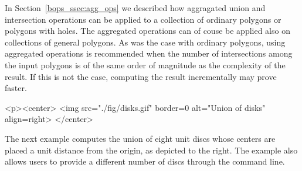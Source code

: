 In Section~\ref{bops_ssec:agg_ops} we described how aggragated union and
intersection operations can be applied to a collection of ordinary polygons
or polygons with holes. The aggregated operations can of couse be applied also
on collections of general polygons. As was the case with ordinary polygons,
using aggregated operations is recommended when the number of intersections
among the input polygons is of the same order of magnitude as the complexity
of the result. If this is not the case, computing the result incrementally
may prove faster.

\lcTex{%
  \setlength{\widthRight}{3.4cm}
  \setlength{\widthLeft}{\widthLineReal}
  \addtolength{\widthLeft}{-\widthRight}
  \begin{minipage}{\widthLeft}
}
\label{fig:disks}
\begin{ccHtmlOnly}
  <p><center>
    <img src="./fig/disks.gif" border=0 alt="Union of disks" align=right>
  </center>
\end{ccHtmlOnly}
The next example computes the union of eight unit discs whose centers are
placed a unit distance from the origin, as depicted to the right. The example
also allows users to provide a different number of discs through the command
line.
\\


